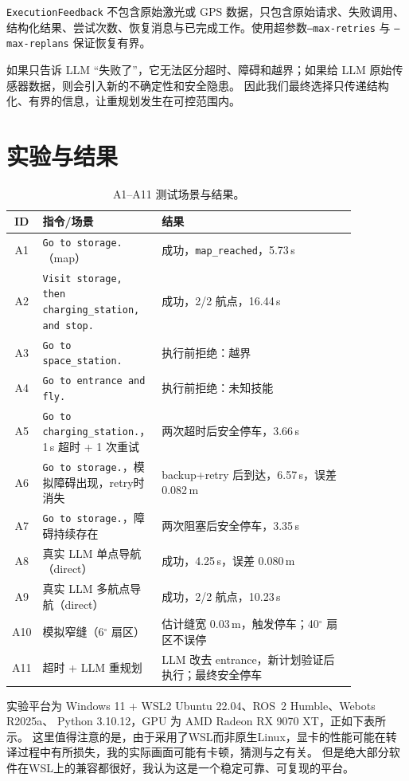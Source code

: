 \documentclass[10pt,twocolumn]{ctexart}
\begin{document}
\texttt{ExecutionFeedback} 不包含原始激光或 GPS 数据，只包含原始请求、失败调用、
结构化结果、尝试次数、恢复消息与已完成工作。使用超参数\texttt{--max-retries} 与
\texttt{--max-replans} 保证恢复有界。

如果只告诉 LLM “失败了”，它无法区分超时、障碍和越界；如果给 LLM 原始传感器数据，则会引入新的不确定性和安全隐患。
因此我们最终选择只传递结构化、有界的信息，让重规划发生在可控范围内。

\section{实验与结果}
\label{sec:exp}

\begin{table}[!t]
\centering
\scriptsize
\setlength{\tabcolsep}{3pt}
\begin{tabular}{@{}c p{0.26\linewidth} p{0.60\linewidth}@{}}
\hline
ID & 指令/场景 & 结果 \\
\hline
A1 & \texttt{Go to storage.}（map） & 成功，\texttt{map\_reached}，5.73\,s \\
A2 & \texttt{Visit storage, then charging\_station, and stop.} & 成功，2/2 航点，16.44\,s \\
A3 & \texttt{Go to space\_station.} & 执行前拒绝：越界 \\
A4 & \texttt{Go to entrance and fly.} & 执行前拒绝：未知技能 \\
A5 & \texttt{Go to charging\_station.}，1\,s 超时 + 1 次重试 & 两次超时后安全停车，3.66\,s \\
A6 & \texttt{Go to storage.}，模拟障碍出现，retry时消失 & backup+retry 后到达，6.57\,s，误差 0.082\,m \\
A7 & \texttt{Go to storage.}，障碍持续存在 & 两次阻塞后安全停车，3.35\,s \\
A8 & 真实 LLM 单点导航（direct） & 成功，4.25\,s，误差 0.080\,m \\
A9 & 真实 LLM 多航点导航（direct） & 成功，2/2 航点，10.23\,s \\
A10 & 模拟窄缝（6$^\circ$ 扇区） & 估计缝宽 0.03\,m，触发停车；40$^\circ$ 扇区不误停 \\
A11 & 超时 + LLM 重规划 & LLM 改去 entrance，新计划验证后执行；最终安全停车 \\
\hline
\end{tabular}
\caption{A1--A11 测试场景与结果。}
\end{table}

实验平台为 Windows 11 + WSL2 Ubuntu 22.04、ROS~2 Humble、Webots R2025a、
Python 3.10.12，GPU 为 AMD Radeon RX 9070 XT，正如下表所示。
这里值得注意的是，由于采用了WSL而非原生Linux，显卡的性能可能在转译过程中有所损失，我的实际画面可能有卡顿，猜测与之有关。
但是绝大部分软件在WSL上的兼容都很好，我认为这是一个稳定可靠、可复现的平台。
\end{document}
